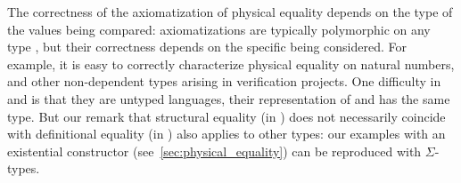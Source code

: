 The correctness of the axiomatization of physical equality depends on the type of the values being compared: axiomatizations are typically polymorphic on any type , but their correctness depends on the specific  being considered.
%
For example, it is easy to correctly characterize physical equality on natural numbers, and other non-dependent types arising in \Rocq verification projects.
%
One difficulty in \HeapLang and \ZooLang is that they are untyped languages, their representation of  and  has the same type.
%
But our remark that structural equality (in \OCaml) does not necessarily coincide with definitional equality (in \Rocq) also applies to other \Rocq types: our examples with an existential  constructor (see~\cref{sec:physical_equality}) can be reproduced with $\Sigma$-types.

